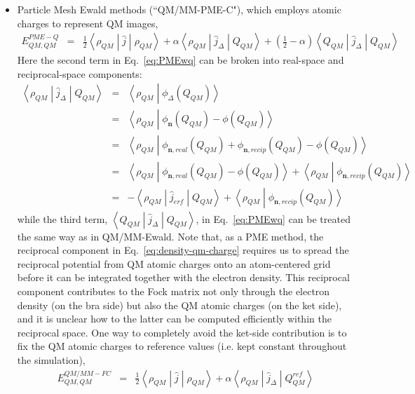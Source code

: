 \documentclass[aip,jcp,preprint,superscriptaddress,amsmath,amssymb]{revtex4-1}
\begin{document}
\begin{itemize}
\item Particle Mesh Ewald methods (``QM/MM-PME-C"), which employs atomic charges to represent QM images,  
\begin{eqnarray}
E_{QM,QM}^{PME-Q} & =  &  \frac{1}{2} \left< \rho_{QM}  \middle| \hat{j} \middle| \rho_{QM}  \right>  + \alpha \left< \rho_{QM}  \middle| \hat{j}_ {\Delta} \middle| Q_{QM}  \right>
+ ( \frac{1}{2} -  \alpha)   \left< Q_{QM}  \middle| \hat{j}_ {\Delta} \middle| Q_{QM}  \right> \label{eq:PMEwq}  
\end{eqnarray} 
Here the second term in Eq.~\ref{eq:PMEwq} can be broken into real-space and reciprocal-space components: 
\begin{eqnarray}
\left< \rho_{QM}  \middle| \hat{j}_ {\Delta} \middle| Q_{QM}  \right>  & =  & \left< \rho_{QM}  \middle| \phi_ {\Delta} (Q_{QM})  \right>  \nonumber   \\
& =  & \left< \rho_{QM}  \middle| \phi_ {\mathbf{n}} (Q_{QM})  - \phi (Q_{QM}) \right>   \nonumber \\
& = & \left< \rho_{QM}  \middle|  \phi_ {\mathbf{n}, real} (Q_{QM}) + \phi_ {\mathbf{n}, recip} (Q_{QM})  - \phi (Q_{QM}) \right>   \nonumber  \\
& = & \left< \rho_{QM}  \middle|  \phi_ {\mathbf{n}, real} (Q_{QM})  - \phi (Q_{QM}) \right>  +  \left< \rho_{QM}  \middle|  \phi_ {\mathbf{n}, recip} (Q_{QM})  \right>  \nonumber \\
& = & - \left< \rho_{QM}  \middle|  \hat{j}_{erf}  \middle| Q_{QM} \right> + \left< \rho_{QM}  \middle|  \phi_ {\mathbf{n}, recip} (Q_{QM}) \right>     \label{eq:density-qm-charge} 
\end{eqnarray}
while the third term, $ \left< Q_{QM}  \middle| \hat{j}_ {\Delta} \middle| Q_{QM}  \right>$, in Eq.~\ref{eq:PMEwq} can be treated the same way as in QM/MM-Ewald. 
Note that, as a PME method, the reciprocal component in Eq.~\ref{eq:density-qm-charge} requires us to spread the reciprocal potential from QM atomic charges onto an atom-centered grid
before it can be integrated together with the electron density.   
This reciprocal component contributes to the Fock matrix not only through the electron density (on the bra side) but also the QM atomic charges (on the ket side), 
and it is unclear how to the latter can be computed efficiently within the reciprocal space.  
One way to completely avoid the ket-side contribution is to fix the QM atomic charges to reference values (i.e. kept constant throughout the simulation),
\begin{eqnarray}
E_{QM,QM}^{QM/MM-FC} & =  &  \frac{1}{2} \left< \rho_{QM}  \middle| \hat{j} \middle| \rho_{QM}  \right>  + \alpha \left< \rho_{QM}  \middle| \hat{j}_ {\Delta} \middle| Q_{QM}^{ref} \right>

\end{eqnarray}
\end{itemize}
\end{document}
